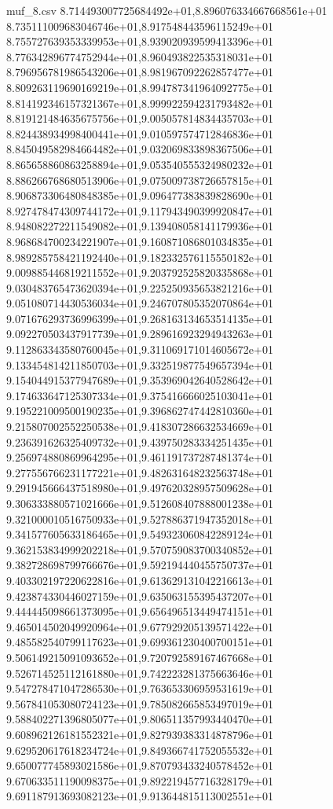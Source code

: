 \begin{filecontents*}{muf_8.csv}
8.714493007725684492e+01,8.896076334667668561e+01
8.735111009683046746e+01,8.917548443596115249e+01
8.755727639353339953e+01,8.939020939599413396e+01
8.776342896774752944e+01,8.960493822535318031e+01
8.796956781986543206e+01,8.981967092262857477e+01
8.809263119690169219e+01,8.994787341964092775e+01
8.814192346157321367e+01,8.999922594231793482e+01
8.819121484635675756e+01,9.005057814834435703e+01
8.824438934998400441e+01,9.010597574712846836e+01
8.845049582984664482e+01,9.032069833898367506e+01
8.865658860863258894e+01,9.053540555324980232e+01
8.886266768680513906e+01,9.075009738726657815e+01
8.906873306480848385e+01,9.096477383839828690e+01
8.927478474309744172e+01,9.117943490399920847e+01
8.948082272211549082e+01,9.139408058141179936e+01
8.968684700234221907e+01,9.160871086801034835e+01
8.989285758421192440e+01,9.182332576115550182e+01
9.009885446819211552e+01,9.203792525820335868e+01
9.030483765473620394e+01,9.225250935653821216e+01
9.051080714430536034e+01,9.246707805352070864e+01
9.071676293736996399e+01,9.268163134653514135e+01
9.092270503437917739e+01,9.289616923294943263e+01
9.112863343580760045e+01,9.311069171014605672e+01
9.133454814211850703e+01,9.332519877549657394e+01
9.154044915377947689e+01,9.353969042640528642e+01
9.174633647125307334e+01,9.375416666025103041e+01
9.195221009500190235e+01,9.396862747442810360e+01
9.215807002552250538e+01,9.418307286632534669e+01
9.236391626325409732e+01,9.439750283334251435e+01
9.256974880869964295e+01,9.461191737287481374e+01
9.277556766231177221e+01,9.482631648232563748e+01
9.291945666437518980e+01,9.497620328957509628e+01
9.306333880571021666e+01,9.512608407888001238e+01
9.321000010516750933e+01,9.527886371947352018e+01
9.341577605633186465e+01,9.549323060842289124e+01
9.362153834999202218e+01,9.570759083700340852e+01
9.382728698799766676e+01,9.592194440455750737e+01
9.403302197220622816e+01,9.613629131042216613e+01
9.423874330446027159e+01,9.635063155395437207e+01
9.444445098661373095e+01,9.656496513449474151e+01
9.465014502049920964e+01,9.677929205139571422e+01
9.485582540799117623e+01,9.699361230400700151e+01
9.506149215091093652e+01,9.720792589167467668e+01
9.526714525112161880e+01,9.742223281375663646e+01
9.547278471047286530e+01,9.763653306959531619e+01
9.567841053080724123e+01,9.785082665853497019e+01
9.588402271396805077e+01,9.806511357993440470e+01
9.608962126181552321e+01,9.827939383314878796e+01
9.629520617618234724e+01,9.849366741752055532e+01
9.650077745893021586e+01,9.870793433240578452e+01
9.670633511190098375e+01,9.892219457716328179e+01
9.691187913693082123e+01,9.913644815113002551e+01

\end{filecontents*}
